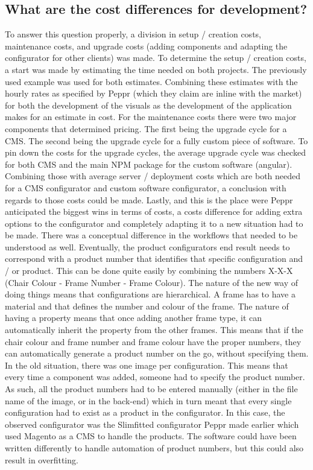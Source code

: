 \subsection{What are the cost differences for development?}
To answer this question properly, a division in setup / creation costs, maintenance costs, and upgrade costs (adding components and adapting the configurator for other clients) was made. To determine the setup / creation costs, a start was made by estimating the time needed on both projects. The previously used example was used for both estimates. Combining these estimates with the hourly rates as specified by Peppr (which they claim are inline with the market) for both the development of the visuals as the development of the application makes for an estimate in cost.\newline
For the maintenance costs there were two major components that determined pricing. The first being the upgrade cycle for a CMS. The second being the upgrade cycle for a fully custom piece of software. To pin down the costs for the upgrade cycles, the average upgrade cycle was checked for both CMS and the main NPM package for the custom software (angular). Combining those with average server / deployment costs which are both needed for a CMS configurator and custom software configurator, a conclusion with regards to those costs could be made.\newline
Lastly, and this is the place were Peppr anticipated the biggest wins in terms of costs, a costs difference for adding extra options to the configurator and completely adapting it to a new situation had to be made. There was a conceptual difference in the workflows that needed to be understood as well. Eventually, the product configurators end result needs to correspond with a product number that identifies that specific configuration and / or product. This can be done quite easily by combining the numbers X-X-X (Chair Colour - Frame Number - Frame Colour). The nature of the new way of doing things means that configurations are hierarchical. A frame has to have a material and that defines the number and colour of the frame. The nature of having a property means that once adding another frame type, it can automatically inherit the property from the other frames. This means that if the chair colour and frame number and frame colour have the proper numbers, they can automatically generate a product number on the go, without specifying them.\newline
In the old situation, there was one image per configuration. This means that every time a component was added, someone had to specify the product number. As such, all the product numbers had to be entered manually (either in the file name of the image, or in the back-end) which in turn meant that every single configuration had to exist as a product in the configurator. In this case, the observed configurator was the Slimfitted configurator Peppr made earlier which used Magento as a CMS to handle the products. The software could have been written differently to handle automation of product numbers, but this could also result in overfitting.\newline
